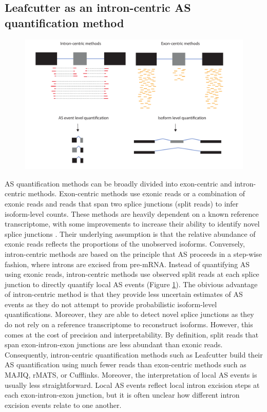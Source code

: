 \subsection{Leafcutter as an intron-centric AS quantification method}
\begin{figure}
    \centering
    \includegraphics[width=\textwidth]{intron_exon_centric}
    \caption{}
    \label{fig:intron_exon_centric}   
  \end{figure}
AS quantification methods can be broadly divided into exon-centric and intron-centric methods. Exon-centric methods use exonic reads or a combination of exonic reads and reads that span two splice junctions (split reads) to infer isoform-level counts. These methods are heavily dependent on a known reference transcriptome, with some improvements to increase their ability to identify novel splice junctions \cite{Vaquero-Garcia2016-dv}. Their underlying assumption is that the relative abundance of exonic reads reflects the proportions of the unobserved isoforms. Conversely, intron-centric methods are based on the principle that AS proceeds in a step-wise fashion, where introns are excised from pre-mRNA. Instead of quantifying AS using exonic reads, intron-centric methods use observed split reads at each splice junction to directly quantify local AS events (Figure \ref{fig:intron_exon_centric}). The obivious advantage of intron-centric method is that they provide less uncertain estimates of AS events as they do not attempt to provide probabilistic isoform-level quantifications. Moreover, they are able to detect novel splice junctions as they do not rely on a reference transcriptome to reconstruct isoforms. However, this comes at the cost of precision and interpretability. By definition, split reads that span exon-intron-exon junctions are less abundant than exonic reads. Consequently, intron-centric quantification methods such as Leafcutter build their AS quantification using much fewer reads than exon-centric methods such as MAJIQ, rMATS, or Cufflinks. Moreover, the interpretation of local AS events is usually less straightforward. Local AS events reflect local intron excision steps at each exon-intron-exon junction, but it is often unclear how different intron excision events relate to one another. \\


